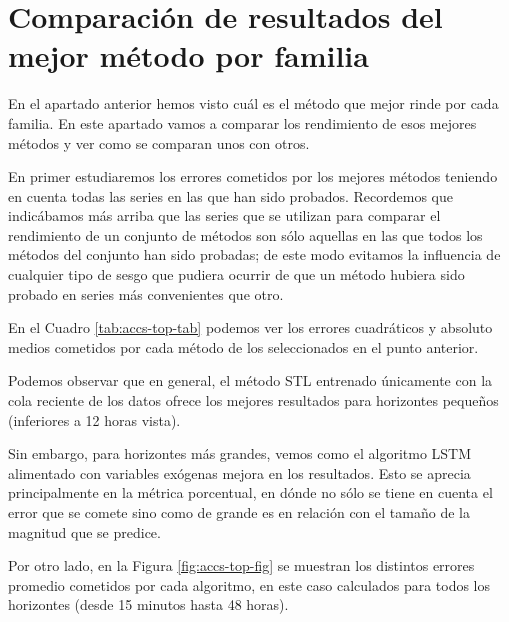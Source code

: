 \documentclass[]{book}
\begin{document}
\section{Comparación de resultados del mejor método por
familia}\label{comparacion-de-resultados-del-mejor-metodo-por-familia}

En el apartado anterior hemos visto cuál es el método que mejor rinde
por cada familia. En este apartado vamos a comparar los rendimiento de
esos mejores métodos y ver como se comparan unos con otros.

En primer estudiaremos los errores cometidos por los mejores métodos
teniendo en cuenta todas las series en las que han sido probados.
Recordemos que indicábamos más arriba que las series que se utilizan
para comparar el rendimiento de un conjunto de métodos son sólo aquellas
en las que todos los métodos del conjunto han sido probadas; de este
modo evitamos la influencia de cualquier tipo de sesgo que pudiera
ocurrir de que un método hubiera sido probado en series más convenientes
que otro.

En el Cuadro \ref{tab:accs-top-tab} podemos ver los errores cuadráticos
y absoluto medios cometidos por cada método de los seleccionados en el
punto anterior.

Podemos observar que en general, el método STL entrenado únicamente con
la cola reciente de los datos ofrece los mejores resultados para
horizontes pequeños (inferiores a 12 horas vista).

Sin embargo, para horizontes más grandes, vemos como el algoritmo LSTM
alimentado con variables exógenas mejora en los resultados. Esto se
aprecia principalmente en la métrica porcentual, en dónde no sólo se
tiene en cuenta el error que se comete sino como de grande es en
relación con el tamaño de la magnitud que se predice.

Por otro lado, en la Figura \ref{fig:accs-top-fig} se muestran los
distintos errores promedio cometidos por cada algoritmo, en este caso
calculados para todos los horizontes (desde 15 minutos hasta 48 horas).
\end{document}
